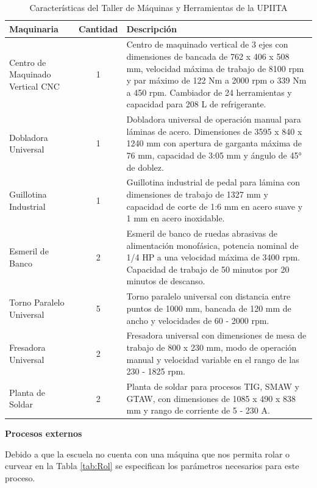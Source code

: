 \begin{table}[H]
  \centering
  \caption{Características del Taller de Máquinas y Herramientas de la UPIITA}
    \begin{tabular}{|p{8.645em}|c|p{19.57em}|}
    \hline
    \textbf{Maquinaria} & \textbf{Cantidad} & \textbf{Descripción} \\
    \hline \hline
    Centro de Maquinado Vertical CNC & 1 & Centro de maquinado vertical de 3 ejes con dimensiones de bancada de 762 x 406 x 508 mm, velocidad máxima de trabajo de 8100 rpm y par máximo de 122 Nm a 2000 rpm o 339 Nm a 450 rpm. Cambiador de 24 herramientas y capacidad para 208 L de refrigerante. \\
    \hline
    Dobladora Universal & 1 & Dobladora universal de operación manual para láminas de acero. Dimensiones de 3595 x 840 x 1240 mm con apertura de garganta máxima de 76 mm, capacidad de 3:05 mm y ángulo de 45° de doblez. \\
    \hline
    Guillotina Industrial & 1 & Guillotina industrial de pedal para lámina con dimensiones de trabajo de 1327 mm y capacidad de corte de 1:6 mm en acero suave y 1 mm en acero inoxidable. \\
    \hline
    Esmeril de Banco & 2 & Esmeril de banco de ruedas abrasivas de alimentación monofásica, potencia nominal de 1/4 HP a una velocidad máxima de 3400 rpm. Capacidad de trabajo de 50 minutos por 20 minutos de descanso. \\
    \hline
    Torno Paralelo Universal & 5 & Torno paralelo universal con distancia entre puntos de 1000 mm, bancada de 120 mm de ancho y velocidades de 60 - 2000 rpm. \\
    \hline
    Fresadora Universal & 2 & Fresadora universal con dimensiones de mesa de trabajo de 800 x 230 mm, modo de operación manual y velocidad variable en el rango de las 230 - 1825 rpm. \\
    \hline
    Planta de Soldar & 2 & Planta de soldar para procesos TIG, SMAW y GTAW, con dimensiones de 1085 x 490 x 838 mm y rango de corriente de 5 - 230 A. \\
    \hline
    \end{tabular}%
  \label{tab:MaqUPIITA}%
\end{table}%

\newpage
\textbf{Procesos externos}

Debido a que la escuela no cuenta con una máquina que nos permita rolar o curvear en la Tabla \ref{tab:Rol} se especifican los parámetros necesarios para este proceso. 


